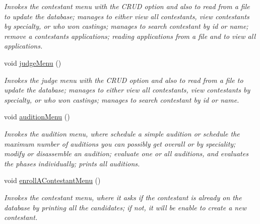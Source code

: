 \begin{DoxyCompactItemize}
\begin{DoxyCompactList}\small\item\em Invokes the contestant menu with the C\+R\+UD option and also to read from a file to update the database; manages to either view all contestants, view contestants by specialty, or who won castings; manages to search contestant by id or name; remove a contestant\textquotesingle{}s applications; reading applications from a file and to view all applications. \end{DoxyCompactList}\item 
\mbox{\label{class_company_m_s_ab0f02c294f82400a7874d960908dd01f}} 
void \hyperlink{class_company_m_s_ab0f02c294f82400a7874d960908dd01f}{judge\+Menu} ()
\begin{DoxyCompactList}\small\item\em Invokes the judge menu with the C\+R\+UD option and also to read from a file to update the database; manages to either view all contestants, view contestants by specialty, or who won castings; manages to search contestant by id or name. \end{DoxyCompactList}\item 
\mbox{\label{class_company_m_s_a9a98c34c80840d8f04b0fce65288e8b6}} 
void \hyperlink{class_company_m_s_a9a98c34c80840d8f04b0fce65288e8b6}{audition\+Menu} ()
\begin{DoxyCompactList}\small\item\em Invokes the audition menu, where schedule a simple audition or schedule the maximum number of auditions you can possibly get overall or by speciality; modify or disassemble an audition; evaluate one or all auditions, and evaluates the phases individually; prints all auditions. \end{DoxyCompactList}\item 
\mbox{\label{class_company_m_s_a177187aa99d595796b19afbfc3581175}} 
void \hyperlink{class_company_m_s_a177187aa99d595796b19afbfc3581175}{enroll\+A\+Contestant\+Menu} ()
\begin{DoxyCompactList}\small\item\em Invokes the contestant menu, where it asks if the contestant is already on the database by printing all the candidates; if not, it will be enable to create a new contestant. \end{DoxyCompactList}\item 

\end{DoxyCompactItemize}
